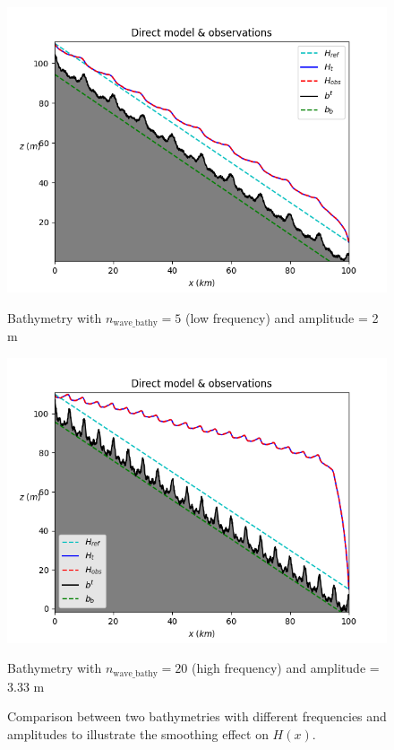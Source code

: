 \documentclass{article}
\begin{document}
\begin{figure}[H]
    \centering
    \begin{minipage}[b]{0.45\linewidth}
        \centering
        \includegraphics[width=\linewidth]{Images_Axel/n_wave_bathy_5.png}
        \caption{Bathymetry with \( n_{\text{wave\_bathy}} = 5 \) (low frequency) and amplitude = 2 m}
        \label{fig:bathy_low}
    \end{minipage}
    \hfill
    \begin{minipage}[b]{0.45\linewidth}
        \centering
        \includegraphics[width=\linewidth]{Images_Axel/n_20_amp_3.png}
        \caption{Bathymetry with \( n_{\text{wave\_bathy}} = 20 \) (high frequency) and amplitude = 3.33 m}
        \label{fig:bathy_high}
    \end{minipage}
    \caption*{\small Comparison between two bathymetries with different frequencies and amplitudes to illustrate the smoothing effect on \( H(x) \).}
    \label{fig:bathy_all}
\end{figure}
\end{document}
